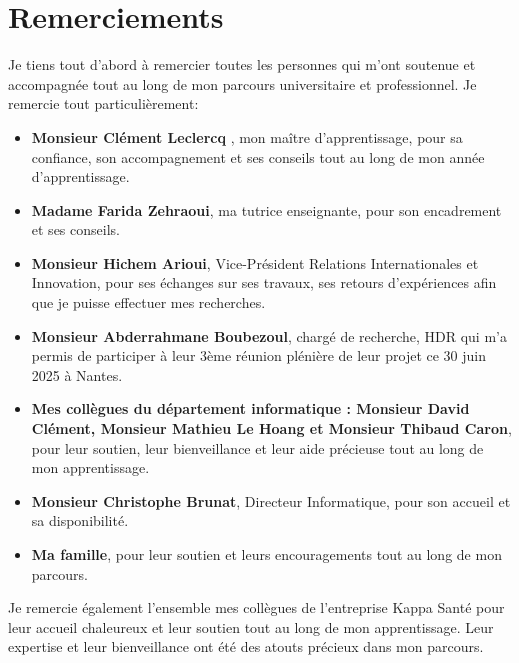 \section{Remerciements}
Je tiens tout d'abord à remercier toutes les personnes qui m'ont soutenue et accompagnée tout au long de mon parcours universitaire et professionnel. 
Je remercie tout particulièrement: \
\begin{itemize}
    \item \textbf{Monsieur Clément Leclercq }, mon maître d'apprentissage, pour sa confiance, son accompagnement et ses conseils tout au long de mon année d'apprentissage.
    \item \textbf{Madame Farida Zehraoui}, ma tutrice enseignante, pour son encadrement et ses conseils.
    \item \textbf{Monsieur Hichem Arioui}, Vice-Président Relations Internationales et Innovation, pour ses échanges sur ses travaux, ses retours d'expériences afin que je puisse effectuer mes recherches.
    \item \textbf{Monsieur Abderrahmane Boubezoul}, chargé de recherche, HDR qui m'a permis de participer à leur 3ème réunion plénière de leur projet ce 30 juin 2025 à Nantes.
    \item \textbf{Mes collègues du département informatique : Monsieur David Clément, Monsieur Mathieu Le Hoang et Monsieur Thibaud Caron}, pour leur soutien, leur bienveillance et leur aide précieuse tout au long de mon apprentissage.
    \item \textbf{Monsieur Christophe Brunat}, Directeur Informatique, pour son accueil et sa disponibilité.
    \item \textbf{Ma famille}, pour leur soutien et leurs encouragements tout au long de mon parcours.
\end{itemize}
Je remercie également l'ensemble mes collègues de l'entreprise Kappa Santé pour leur accueil chaleureux et leur soutien tout au long de mon apprentissage. Leur expertise et leur bienveillance ont été des atouts précieux dans mon parcours.